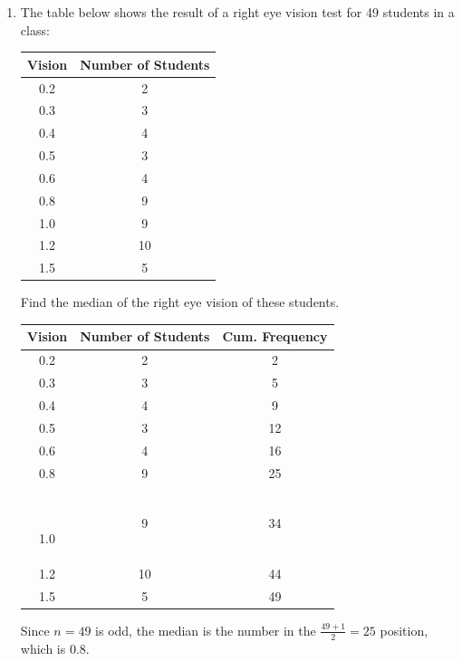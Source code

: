 \documentclass{report}
\begin{document}
\begin{multicols}{2}
\begin{enumerate}
    \item The table below shows the result of a right eye vision test for 49 students in
          a class:
          \begin{center}
            \begin{tabular}{|c|c|}
              \hline
              Vision & Number of Students \\
              \hline
              0.2    & 2                  \\
              0.3    & 3                  \\
              0.4    & 4                  \\
              0.5    & 3                  \\
              0.6    & 4                  \\
              0.8    & 9                  \\
              1.0    & 9                  \\
              1.2    & 10                 \\
              1.5    & 5                  \\
              \hline
            \end{tabular}
          \end{center}
          Find the median of the right eye vision of these students.
          \sol{}
          \begin{center}
            \begin{tabular}{|c|c|c|}
              \hline
              Vision & Number of Students & Cum. Frequency \\
              \hline
              0.2    & 2                  & 2              \\
              0.3    & 3                  & 5              \\
              0.4    & 4                  & 9              \\
              0.5    & 3                  & 12             \\
              0.6    & 4                  & 16             \\
              0.8    & 9                  & 25             \\\

              1.0    & 9                  & 34             \\
              1.2    & 10                 & 44             \\
              1.5    & 5                  & 49             \\
              \hline
            \end{tabular}
          \end{center}
          Since $n = 49$ is odd, the median is the number in the $\frac{49 + 1}{2} = 25$ position, which is $0.8$.


\end{enumerate}
\end{multicols}
\end{document}
